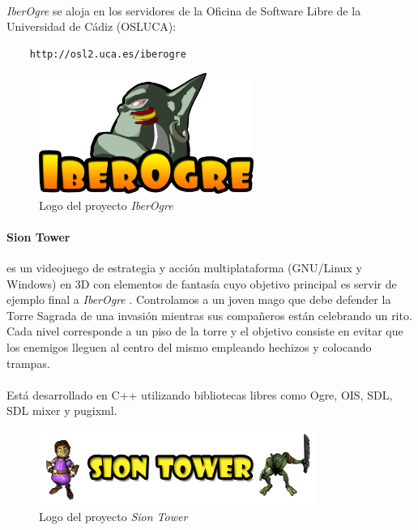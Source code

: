\documentclass[16pt,spanish]{article}
\def \juego{\emph {Sion Tower} }
\def \wiki{\emph{IberOgre} }
\begin{document}
\paragraph{}
\wiki se aloja en los servidores de la Oficina de Software Libre de la
Universidad de Cádiz (OSLUCA):

\begin{verbatim}
    http://osl2.uca.es/iberogre
\end{verbatim}


\begin{figure}[H]
    \centering
        \includegraphics[width=7cm]{img/iberogre.png} 
    \caption{Logo del proyecto \wiki}
    \label{img:logo-iberogre}
\end{figure}

\paragraph{Sion Tower}
es un videojuego de estrategia y acción multiplataforma (GNU/Linux y Windows)
en 3D con elementos de fantasía cuyo objetivo principal es servir
de ejemplo final a \wiki. Controlamos
a un joven mago que debe defender la Torre Sagrada de una invasión mientras
sus compañeros están celebrando un rito. Cada nivel corresponde a un piso
de la torre y el objetivo consiste en evitar que los enemigos lleguen al
centro del mismo empleando hechizos y colocando trampas.

\paragraph{}
Está desarrollado en C++ utilizando bibliotecas libres como Ogre, OIS, SDL,
SDL mixer y pugixml. 

\begin{figure}[H]
    \centering
        \includegraphics[width=9cm]{img/siontower.png} 
    \caption{Logo del proyecto \juego}
    \label{img:logo-siontower}
\end{figure}
\end{document}
